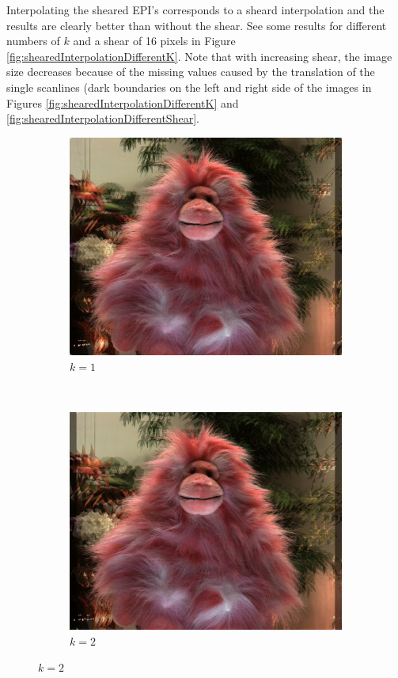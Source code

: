 \documentclass[a4paper]{article}
\begin{document}
Interpolating the sheared EPI's corresponds to a sheard interpolation and the results are clearly better than without the shear. See some results for different numbers of $k$ and a shear of 16 pixels in Figure \ref{fig:shearedInterpolationDifferentK}. Note that with increasing shear, the image size decreases because of the missing values caused by the translation of the single scanlines (dark boundaries on the left and right side of the images in Figures \ref{fig:shearedInterpolationDifferentK} and \ref{fig:shearedInterpolationDifferentShear}.
\begin{figure}[ht]
	\begin{subfigure}[h]{0.48\textwidth}
	  \includegraphics[width=\textwidth]{ShearedInterpolation60_61}
	  \caption*{$k = 1$}
	\end{subfigure}
    	~
	\begin{subfigure}[h]{0.48\textwidth}
	  \centering
	  \includegraphics[width=\textwidth]{ShearedInterpolation59_61}
	  \caption*{$k= 2$}
	\end{subfigure}
	

\end{figure}
\end{document}

